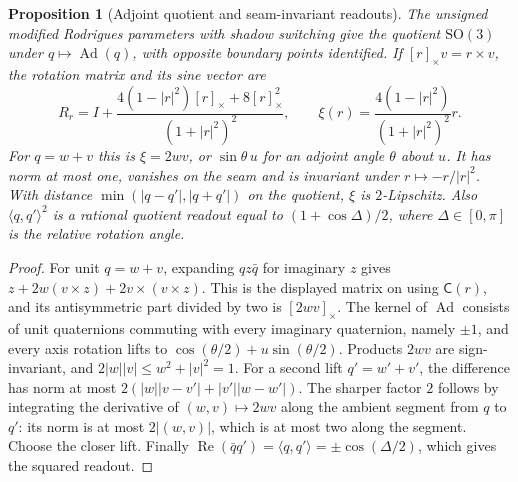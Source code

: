 \documentclass[11pt,reqno]{amsart}
\newtheorem{proposition}[theorem]{Proposition}
\theoremstyle{definition}
\theoremstyle{remark}
\numberwithin{equation}{section}
\newcommand{\Ad}{\operatorname{Ad}}
\newcommand{\re}{\operatorname{Re}}
\newcommand{\ip}[2]{\langle #1,#2\rangle}
\newcommand{\SO}{\mathrm{SO}}
\newcommand{\Cay}{\mathsf{C}}
\begin{document}
\begin{proposition}[Adjoint quotient and seam-invariant readouts]\label{m4:sine}
The unsigned modified Rodrigues parameters with shadow switching give the quotient $\SO(3)$ under $q\mapsto\Ad(q)$, with opposite boundary points identified. If $[r]_\times v=r\times v$, the rotation matrix and its sine vector are
\[
 R_r=I+\frac{4(1-|r|^2)[r]_\times+8[r]_\times^2}{(1+|r|^2)^2},
 \qquad
 \xi(r)=\frac{4(1-|r|^2)}{(1+|r|^2)^2}r.
\]
For $q=w+v$ this is $\xi=2wv$, or $\sin\theta\,u$ for an adjoint angle $\theta$ about $u$. It has norm at most one, vanishes on the seam and is invariant under $r\mapsto-r/|r|^2$. With distance $\min(|q-q'|,|q+q'|)$ on the quotient, $\xi$ is $2$-Lipschitz. Also $\ip q{q'}^2$ is a rational quotient readout equal to $(1+\cos\Delta)/2$, where $\Delta\in[0,\pi]$ is the relative rotation angle.
\end{proposition}
\begin{proof}
For unit $q=w+v$, expanding $qz\bar q$ for imaginary $z$ gives $z+2w(v\times z)+2v\times(v\times z)$. This is the displayed matrix on using $\Cay(r)$, and its antisymmetric part divided by two is $[2wv]_\times$. The kernel of $\Ad$ consists of unit quaternions commuting with every imaginary quaternion, namely $\pm1$, and every axis rotation lifts to $\cos(\theta/2)+u\sin(\theta/2)$. Products $2wv$ are sign-invariant, and $2|w||v|\le w^2+|v|^2=1$. For a second lift $q'=w'+v'$, the difference has norm at most $2(|w||v-v'|+|v'||w-w'|)$. The sharper factor $2$ follows by integrating the derivative of $(w,v)\mapsto2wv$ along the ambient segment from $q$ to $q'$: its norm is at most $2|(w,v)|$, which is at most two along the segment. Choose the closer lift. Finally $\re(\bar q q')=\ip q{q'}=\pm\cos(\Delta/2)$, which gives the squared readout.
\end{proof}
\end{document}
